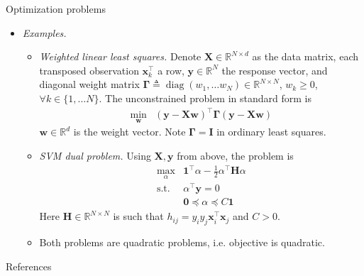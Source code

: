 \documentclass{beamer}
\numberwithin{equation}{section}
\begin{document}
\begin{frame}{Optimization problems}
    \begin{itemize}
        \item
        \textit{Examples.}
        \begin{itemize}
            \item
            \textit{Weighted linear least squares.} Denote $ \mathbf{X} \in
            \mathbb{R}^{N \times d} $ as the data matrix, each transposed
            observation $ \mathbf{x}_k^\top $ a row, $ \mathbf{y} \in
            \mathbb{R}^N $ the response vector, and diagonal weight matrix
            $ \mathbf{\Gamma} \triangleq \operatorname{diag}(w_1, \ldots w_N)
            \in \mathbb{R}^{N \times N} $, $ w_k \ge 0 $,
            $ \forall k \in \{1, \ldots N\} $. The unconstrained problem in
            standard form is
            \begin{equation*}
                \begin{array}{ll}
                    \displaystyle\min_\mathbf{w} &
                    (\mathbf{y} - \mathbf{Xw})^\top\mathbf{\Gamma}
                    (\mathbf{y} - \mathbf{Xw})                
                \end{array}
            \end{equation*}
            $ \mathbf{w} \in \mathbb{R}^d $ is the weight vector. Note
            $ \mathbf{\Gamma} = \mathbf{I} $ in ordinary least squares.

            \item
            \textit{SVM dual problem.} Using $ \mathbf{X}, \mathbf{y} $ from
            above, the problem is
            \begin{equation*}
                \begin{array}{ll}
                    \displaystyle\max_\alpha & \mathbf{1}^\top\alpha -
                    \frac{1}{2}\alpha^\top\mathbf{H}\alpha \\
                    \text{s.t.} & \alpha^\top\mathbf{y} = 0 \\
                    & \mathbf{0} \preceq \alpha \preceq C\mathbf{1}
                \end{array}
            \end{equation*}
            Here $ \mathbf{H} \in \mathbb{R}^{N \times N} $ is such that
            $ h_{ij} = y_iy_j\mathbf{x}_i^\top\mathbf{x}_j $ and $ C > 0 $.

            \item
            Both problems are quadratic problems, i.e. objective is
            quadratic.
        \end{itemize}
    \end{itemize}
\end{frame}

\begin{frame}{References}
    
    
\end{frame}
\end{document}
